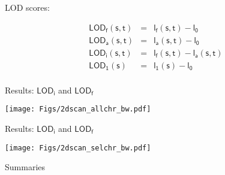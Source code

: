 \documentclass[12pt]{article}
\newcommand{\headsize}{\fontsize{35}{35} \selectfont}
\newcommand{\smallsize}{\fontsize{25}{30} \selectfont}
\newcommand{\lod}{\text{LOD}}
\begin{document}
\hfill \begin{minipage}[t]{10in}
LOD scores:

\vspace{5mm}

\hspace{1cm}
\begin{minipage}{5in}
{\color{myblue}
\begin{eqnarray*}
\mathsf{\lod_f(s,t)}& = &\mathsf{l_f(s,t) - l_0} \\[24pt]
\mathsf{\lod_a(s,t)}& = &\mathsf{l_a(s,t) - l_0} \\[24pt]
\mathsf{\lod_i(s,t)}& = &\mathsf{l_f(s,t) - l_a(s,t)} \\[24pt]
\mathsf{\lod_1(s)}&   = &\mathsf{l_1(s) - l_0} \\[24pt]
\end{eqnarray*}
}
\end{minipage}



\end{minipage}


\newpage

\headsize \color{myyellow}
\hfill \begin{minipage}{5.75in}
\centering
Results: $\mathsf{\lod_i}$ and $\mathsf{\lod_f}$
\end{minipage}

\vfill

\centerline{\texttt{[image: Figs/2dscan\_allchr\_bw.pdf]}}

\newpage

\headsize \color{myyellow}
\hfill \begin{minipage}{5.75in}
\centering
Results: $\mathsf{\lod_i}$ and $\mathsf{\lod_f}$
\end{minipage}

\vfill

\centerline{\texttt{[image: Figs/2dscan\_selchr\_bw.pdf]}}

\newpage

\headsize \color{myyellow}
\hfill \begin{minipage}{5.75in}
\centering
Summaries
\end{minipage}

\vspace{15mm}

\color{mywhite} \smallsize
\end{document}
